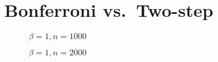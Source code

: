 \section{Bonferroni vs.\ Two-step}
%  
%
%  
%
%  
%
%  
%
%  
%
%  
%
%  
%
%  
%
\begin{figure}
  \centering
  
  \caption{$\beta = 1, n = 1000$}
\end{figure}

\begin{figure}
  \centering
  
  \caption{$\beta = 1, n = 2000$}
\end{figure}

